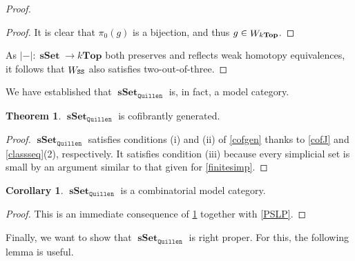 \documentclass[10pt,letterpaper,cm]{nupset}
\theoremstyle{definition}
\theoremstyle{theorem}
\newtheorem{theorem}[definition]{Theorem}
\newtheorem{corollary}[definition]{Corollary}
\theoremstyle{remark}
\newcommand{\0}{\mathbf{0}}
\newcommand{\1}{\mathbf{1}}
\newcommand{\2}{\mathbf{2}}
\DeclareMathOperator{\sset}{\mathbf{sSet}}
\DeclareMathOperator{\we}{\mathnormal{W}}
\begin{document}
\begin{proof}
\begin{proof}
\medskip

It is clear that $\pi_0(g)$ is a bijection, and thus $g \in \we_{k\mathbf{Top}}$.
\end{proof}
As $\left\lvert{-}\right\rvert : \sset \to k\mathbf{Top}$ both preserves and reflects weak homotopy equivalences, it follows that $\we_{\mathtt{SS}}$ also satisfies two-out-of-three.
\end{proof}

\smallskip

We have established that $\sset_{\mathtt{Quillen}}$ is, in fact, a model category. 

\medskip

\begin{theorem}\label{CFG}
$\sset_{\mathtt{Quillen}}$ is cofibrantly generated.
\end{theorem}
\begin{proof}
$\sset_{\mathtt{Quillen}}$ satisfies conditions (i) and (ii) of \cref{cofgen} thanks to \cref{cofJ} and \cref{classseq}(2), respectively. It satisfies condition (iii) because every simplicial set is small by an argument similar to that given for \cref{finitesimp}.
\end{proof}

\begin{corollary}
$\sset_{\mathtt{Quillen}}$  is a combinatorial model category.
\end{corollary}
\begin{proof}
This is an immediate consequence of \cref{CFG} together with \cref{PSLP}.
\end{proof}

\medskip

Finally, we want to show that $\sset_{\mathtt{Quillen}}$ is right proper. For this, the following lemma is useful.
\end{document}
